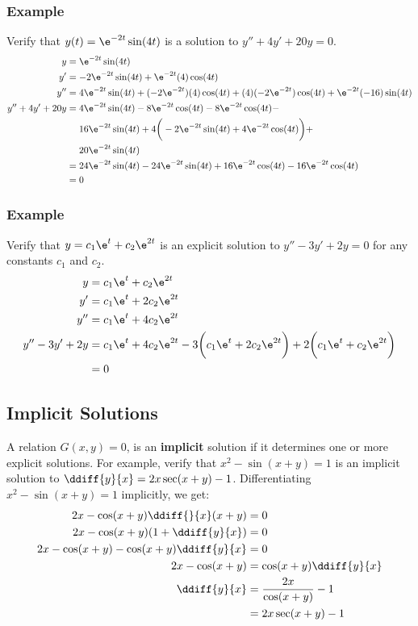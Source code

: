 \documentclass{math}
\begin{document}
\subsubsection*{Example}
Verify that \( y(t)=\e^{-2t}\sin(4t) \) is a solution to \( y''+4y'+20y = 0 \).
\begin{align*}
  y &= \e^{-2t}\sin(4t) \\
  y' &= -2\e^{-2t}\sin(4t)+\e^{-2t}(4)\cos(4t) \\
  y'' &= 4\e^{-2t}\sin(4t)+(-2\e^{-2t})(4)\cos(4t)+(4)(-2\e^{-2t})\cos(4t)+
    \e^{-2t}(-16)\sin(4t) \\
  y''+4y'+20y &= 4\e^{-2t}\sin(4t)-8\e^{-2t}\cos(4t)-8\e^{-2t}\cos(4t)- \\
    &~~~~ 16\e^{-2t}\sin(4t)+
      4\bigg(-2\e^{-2t}\sin(4t)+4\e^{-2t}\cos(4t)\bigg)+ \\
    &~~~~ 20\e^{-2t}\sin(4t) \\
  &= 24\e^{-2t}\sin(4t)-24\e^{-2t}\sin(4t)+
    16\e^{-2t}\cos(4t)-16\e^{-2t}\cos(4t) \\
  &= 0
\end{align*}

\subsubsection*{Example}
Verify that \( y = c_1\e^t+c_2\e^{2t} \) is an explicit solution to
\( y''-3y'+2y = 0 \) for any constants \( c_1 \) and \( c_2 \).
\begin{align*}
  y &= c_1\e^t+c_2\e^{2t} \\
  y' &= c_1\e^t+2c_2\e^{2t} \\
  y'' &= c_1\e^t+4c_2\e^{2t} \\
  y''-3y'+2y &= c_1\e^t+4c_2\e^{2t}-
    3\bigg(c_1\e^t+2c_2\e^{2t}\bigg)+2\bigg(c_1\e^t+c_2\e^{2t}\bigg) \\
  &= 0
\end{align*}

\subsection*{Implicit Solutions}
A relation \( G(x,y) = 0 \), is an \textbf{implicit} solution if it determines
one or more explicit solutions. For example, verify that \( x^2-\sin(x+y) = 1 \)
is an implicit solution to \( \ddiff{y}{x} = 2x\sec(x+y)-1 \). Differentiating
\( x^2-\sin(x+y) = 1 \) implicitly, we get:
\begin{align*}
  2x-\cos(x+y)\ddiff{}{x}(x+y) &= 0 \\
  2x-\cos(x+y)(1+\ddiff{y}{x}) &= 0 \\
  2x-\cos(x+y)-\cos(x+y)\ddiff{y}{x} &= 0 \\
  2x-\cos(x+y) &= \cos(x+y)\ddiff{y}{x} \\
  \ddiff{y}{x} &= \frac{2x}{\cos(x+y)}-1 \\
  &= 2x\sec(x+y)-1
\end{align*}
\end{document}
